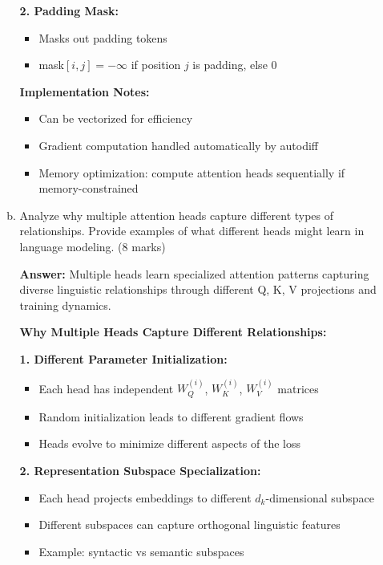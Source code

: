 \documentclass[12pt]{article}
\newcommand{\answer}[1]{{\color{answercolor}\textbf{Answer:} #1}}
\newcommand{\explanation}[1]{{\color{explanationcolor}#1}}
\begin{document}
\begin{center}
\begin{enumerate}[(a)]
\begin{enumerate}[(a)]
{    \textbf{2. Padding Mask:}
    \begin{itemize}
        \item Masks out padding tokens
        \item mask$[i,j] = -\infty$ if position $j$ is padding, else $0$
    \end{itemize}
    
    \textbf{Implementation Notes:}
    \begin{itemize}
        \item Can be vectorized for efficiency
        \item Gradient computation handled automatically by autodiff
        \item Memory optimization: compute attention heads sequentially if memory-constrained
    \end{itemize}
    }
    
    \item Analyze why multiple attention heads capture different types of relationships. Provide examples of what different heads might learn in language modeling. \hfill (8 marks)
    
    \answer{Multiple heads learn specialized attention patterns capturing diverse linguistic relationships through different Q, K, V projections and training dynamics.}
    
    \explanation{
    \textbf{Why Multiple Heads Capture Different Relationships:}
    
    \textbf{1. Different Parameter Initialization:}
    \begin{itemize}
        \item Each head has independent $W_Q^{(i)}$, $W_K^{(i)}$, $W_V^{(i)}$ matrices
        \item Random initialization leads to different gradient flows
        \item Heads evolve to minimize different aspects of the loss
    \end{itemize}
    
    \textbf{2. Representation Subspace Specialization:}
    \begin{itemize}
        \item Each head projects embeddings to different $d_k$-dimensional subspace
        \item Different subspaces can capture orthogonal linguistic features
        \item Example: syntactic vs semantic subspaces
    \end{itemize}
    
}
\end{enumerate}
\end{enumerate}
\end{center}
\end{document}
